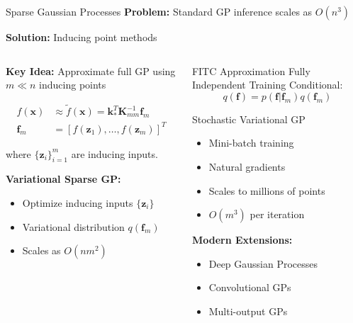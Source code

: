 \documentclass[aspectratio=169,11pt]{beamer}
\newcommand{\bx}{\mathbf{x}}
\begin{document}
\begin{frame}{Sparse Gaussian Processes}
\textbf{Problem:} Standard GP inference scales as $O(n^3)$

\textbf{Solution:} Inducing point methods

\begin{columns}
\begin{column}{0.5\textwidth}
\textbf{Key Idea:} Approximate full GP using $m \ll n$ inducing points

\begin{align}
f(\bx) &\approx \tilde{f}(\bx) = \mathbf{k}_*^T \mathbf{K}_{mm}^{-1} \mathbf{f}_m\\
\mathbf{f}_m &= [f(\mathbf{z}_1), \ldots, f(\mathbf{z}_m)]^T
\end{align}

where $\{\mathbf{z}_i\}_{i=1}^m$ are inducing inputs.

\textbf{Variational Sparse GP:}
\begin{itemize}
\item Optimize inducing inputs $\{\mathbf{z}_i\}$
\item Variational distribution $q(\mathbf{f}_m)$
\item Scales as $O(nm^2)$
\end{itemize}
\end{column}
\begin{column}{0.5\textwidth}
\begin{block}{FITC Approximation}
Fully Independent Training Conditional:
\[q(\mathbf{f}) = p(\mathbf{f}|\mathbf{f}_m) q(\mathbf{f}_m)\]
\end{block}

\begin{block}{Stochastic Variational GP}
\begin{itemize}
\item Mini-batch training
\item Natural gradients
\item Scales to millions of points
\item $O(m^3)$ per iteration
\end{itemize}
\end{block}

\textbf{Modern Extensions:}
\begin{itemize}
\item Deep Gaussian Processes
\item Convolutional GPs
\item Multi-output GPs
\end{itemize}
\end{column}
\end{columns}
\end{frame}
\end{document}
